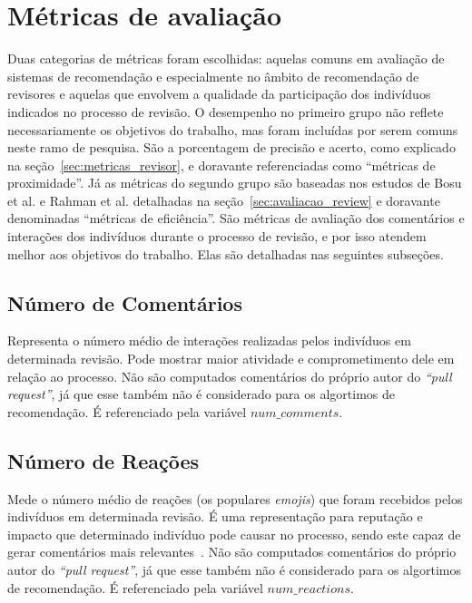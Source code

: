 \documentclass[12pt,openany,oneside,a4paper,english,brazil]{abntbibufjf}
\begin{document}
    \section{Métricas de avaliação}

    Duas categorias de métricas foram escolhidas: aquelas comuns em avaliação de sistemas de recomendação e especialmente no âmbito de recomendação de revisores e aquelas que envolvem a qualidade da participação dos indivíduos indicados no processo de revisão. O desempenho no primeiro grupo não reflete necessariamente os objetivos do trabalho, mas foram incluídas por serem comuns neste ramo de pesquisa\cite{schettino2019b}. São a porcentagem de precisão e acerto, como explicado na seção~\ref{sec:metricas_revisor}, e doravante referenciadas como ``métricas de proximidade''. Já as métricas do segundo grupo são baseadas nos estudos de Bosu et al. \cite{bosu2015} e Rahman et al. \cite{rahman2017} detalhadas na seção~\ref{sec:avaliacao_review} e doravante denominadas ``métricas de eficiência''. São métricas de avaliação dos comentários e interações dos indivíduos durante o processo de revisão, e por isso atendem melhor aos objetivos do trabalho. Elas são detalhadas nas seguintes subseções.


    \subsection{Número de Comentários}
      Representa o número médio de interações realizadas pelos indivíduos em determinada revisão. Pode mostrar maior atividade e comprometimento dele em relação ao processo. Não são computados comentários do próprio autor do \textit{``pull request''}, já que esse também não é considerado para os algortimos de recomendação. É referenciado pela variável $num\_comments$.

    \subsection{Número de Reações}
      Mede o número médio de reações (os populares \textit{emojis}) que foram recebidos pelos indivíduos em determinada revisão. É uma representação para reputação e impacto que determinado indivíduo pode causar no processo, sendo este capaz de gerar comentários mais relevantes~\cite{bosu2015}. Não são computados comentários do próprio autor do \textit{``pull request''}, já que esse também não é considerado para os algortimos de recomendação. É referenciado pela variável $num\_reactions$.
\end{document}
